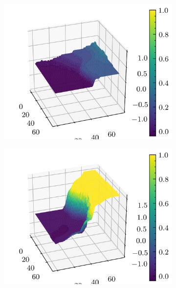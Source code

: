 \documentclass[../document.tex]{subfiles}
\begin{document}
\begin{figure}[H]
    \begin{subfigure}[b]{0.19\textwidth}
        \includegraphics[width=\linewidth]{../img/5/quarry/worst/patch-3d-0.png}
    \end{subfigure}
    \begin{subfigure}[b]{0.19\textwidth}
        \includegraphics[width=\linewidth]{../img/5/quarry/worst/patch-3d-1.png}
    \end{subfigure}  
    \begin{subfigure}[b]{0.19\textwidth}

\end{subfigure}
\end{figure}
\end{document}
